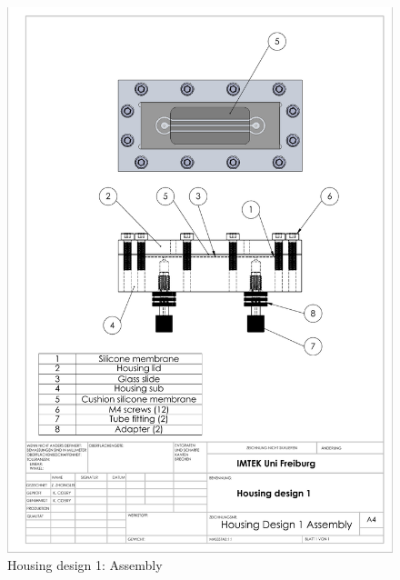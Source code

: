 \begin{figure}[h]%
\centering
\includegraphics[width=1\textwidth]{figures/appendix/housingdesign1}%
\caption{Housing design 1: Assembly}%
\label{housingdesign1}%
\end{figure}

\clearpage

